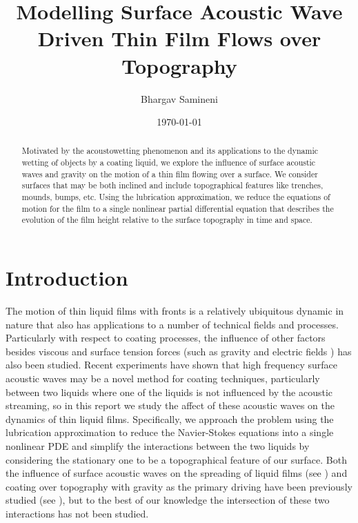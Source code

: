 \documentclass[letterpaper]{article}
\title{Modelling Surface Acoustic Wave Driven Thin Film Flows over Topography}
\author{Bhargav Samineni}
\date{\today}
\begin{document}
 
\maketitle 

\begin{abstract}
    Motivated by the acoustowetting phenomenon and its applications to the dynamic wetting 
    of objects by a coating liquid, we explore the influence of surface acoustic waves and gravity on the motion of a thin film
    flowing over a surface. We consider surfaces that may be both inclined and include topographical features like trenches, mounds, bumps, etc. 
    Using the lubrication approximation, we reduce the equations of motion for the film
    to a single nonlinear partial differential equation that describes the evolution of the film height relative to the 
    surface topography in time and space. 
\end{abstract}
  
 
\section{Introduction}
The motion of thin liquid films with fronts is a relatively
ubiquitous dynamic in nature that also has applications to a number of technical fields and processes. 
Particularly with respect to coating processes, the influence of other factors besides viscous and surface tension
forces (such as gravity \cite{diez2002computing} and electric fields \cite{veremieiev2012electrified}) has also been 
studied. Recent experiments have shown that high frequency surface acoustic waves may be a novel method 
for coating techniques, particularly between two liquids where one of the liquids is not influenced by the acoustic streaming, so in this report we study the affect of these acoustic waves on the dynamics 
of thin liquid films. Specifically, we approach the problem using the lubrication approximation to reduce the 
Navier-Stokes equations into a single nonlinear PDE and simplify the interactions between the two liquids
by considering the stationary one to be a topographical feature of our surface. Both the influence of surface acoustic
waves on the spreading of liquid films (see \cite{altshuler2016free}) and coating over topography with gravity as the primary driving have been previously 
studied (see \cite{kalliadasis2000steady,stillwagon1988topo,veremieiev2011gravity}), but to the best of our knowledge the 
intersection of these two interactions has not been studied. 
\end{document}
